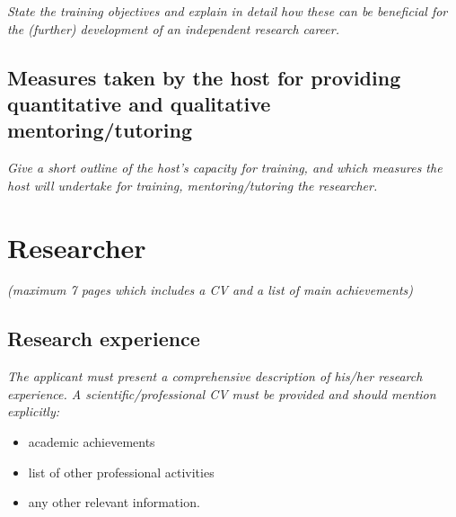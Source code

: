 \documentclass[a4paper,11pt]{article}
\newenvironment{xcomment}{\em}{}
\begin{document}
\begin{xcomment}
 State the training objectives and explain in detail how these can be beneficial for the (further)
development of an independent research career.
\end{xcomment}

\subsection{Measures taken by the host for providing quantitative and qualitative mentoring/tutoring}

\begin{xcomment}
 Give a short outline of the host's capacity for training, and which measures the host will
undertake for training, mentoring/tutoring the researcher.
\end{xcomment}


\newpage
\section{Researcher}
\begin{xcomment}  
(maximum 7 pages which includes a CV and a list of main achievements)
\end{xcomment}

\subsection{Research experience}
\begin{xcomment}
  The applicant must present a comprehensive description of his/her research experience. A
  scientific/professional CV must be provided and should mention explicitly:
  \begin{itemize}
    \item academic achievements
    \item list of other professional activities
    \item any other relevant information.
  \end{itemize}
\end{xcomment}

\newcommand{\cventryAlt}[6]{#1 & #2, #3, #4 \\}
\newcommand{\cventryDescr}[6]{#1 & #2 #3 #4 \\}
\newcommand{\cvitem}[2]{#1 & #2\\}
\newcommand{\cvcomputer}[4]{#1 & #2 & & #3  #4 \\}
\newcommand{\emtitle}{\em}
\newcommand{\siminos}{E. Siminos}
\end{document}
